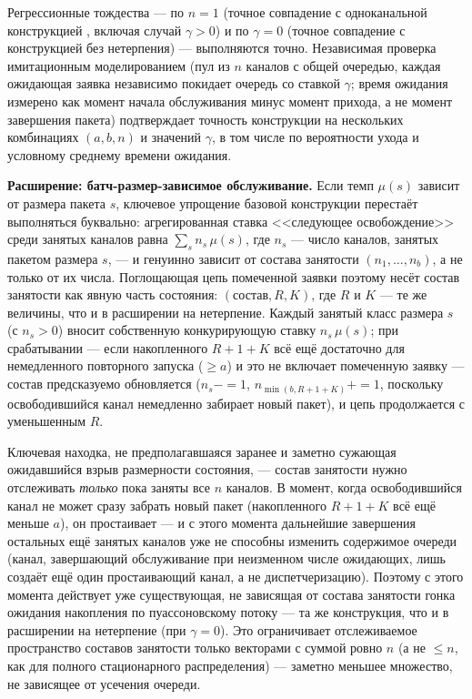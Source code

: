 \documentclass[12pt,a4paper]{article}
\begin{document}
Регрессионные тождества --- по $n=1$ (точное совпадение с одноканальной конструкцией \cite{khabarovsingle2026}, включая случай $\gamma>0$) и по $\gamma=0$ (точное совпадение с конструкцией без нетерпения) --- выполняются точно. Независимая проверка имитационным моделированием (пул из $n$ каналов с общей очередью, каждая ожидающая заявка независимо покидает очередь со ставкой $\gamma$; время ожидания измерено как момент начала обслуживания минус момент прихода, а не момент завершения пакета) подтверждает точность конструкции на нескольких комбинациях $(a,b,n)$ и значений $\gamma$, в том числе по вероятности ухода и условному среднему времени ожидания.

\noindent\textbf{Расширение: батч-размер-зависимое обслуживание.} Если темп $\mu(s)$ зависит от размера пакета $s$, ключевое упрощение базовой конструкции перестаёт выполняться буквально: агрегированная ставка <<следующее освобождение>> среди занятых каналов равна $\sum_s n_s\,\mu(s)$, где $n_s$ --- число каналов, занятых пакетом размера $s$, --- и генуинно зависит от состава занятости $(n_1,\dots,n_b)$, а не только от их числа. Поглощающая цепь помеченной заявки поэтому несёт состав занятости как явную часть состояния: $(\text{состав},R,K)$, где $R$ и $K$ --- те же величины, что и в расширении на нетерпение. Каждый занятый класс размера $s$ (с $n_s>0$) вносит собственную конкурирующую ставку $n_s\,\mu(s)$; при срабатывании --- если накопленного $R+1+K$ всё ещё достаточно для немедленного повторного запуска ($\ge a$) и это не включает помеченную заявку --- состав предсказуемо обновляется ($n_s\mathbin{-{=}}1$, $n_{\min(b,R+1+K)}\mathbin{+{=}}1$, поскольку освободившийся канал немедленно забирает новый пакет), и цепь продолжается с уменьшенным $R$.

Ключевая находка, не предполагавшаяся заранее и заметно сужающая ожидавшийся взрыв размерности состояния, --- состав занятости нужно отслеживать \textit{только} пока заняты все $n$ каналов. В момент, когда освободившийся канал не может сразу забрать новый пакет (накопленного $R+1+K$ всё ещё меньше $a$), он простаивает --- и с этого момента дальнейшие завершения остальных ещё занятых каналов уже не способны изменить содержимое очереди (канал, завершающий обслуживание при неизменном числе ожидающих, лишь создаёт ещё один простаивающий канал, а не диспетчеризацию). Поэтому с этого момента действует уже существующая, не зависящая от состава занятости гонка ожидания накопления по пуассоновскому потоку --- та же конструкция, что и в расширении на нетерпение (при $\gamma=0$). Это ограничивает отслеживаемое пространство составов занятости только векторами с суммой ровно $n$ (а не $\le n$, как для полного стационарного распределения) --- заметно меньшее множество, не зависящее от усечения очереди.
\end{document}
